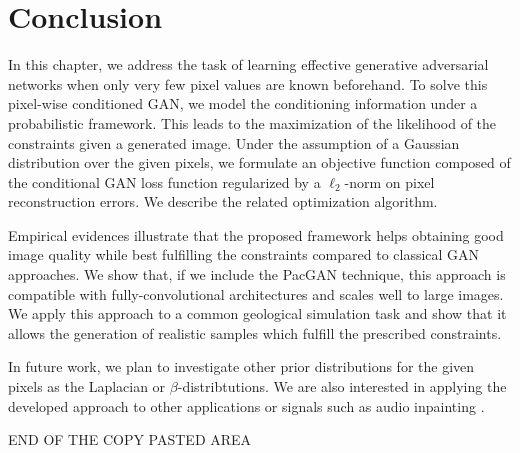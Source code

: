 \section*{Conclusion}
In this chapter, we address the task of learning effective generative adversarial networks when only very few pixel values are known beforehand. To solve this pixel-wise conditioned GAN, we model the conditioning information under a probabilistic framework. This leads to the maximization of the likelihood of the constraints given a
generated image. Under the assumption of a Gaussian distribution over the given pixels, we formulate an objective function composed of the conditional GAN loss function regularized by a $\ell_2$-norm on pixel reconstruction errors. We describe the related optimization algorithm.

Empirical evidences illustrate that the proposed framework helps obtaining good image quality while best fulfilling the constraints compared to classical GAN approaches. We show that, if we include the PacGAN technique,  this  approach  is  compatible  with  fully-convolutional  architectures  and scales well to large images. We apply this approach to a common geological simulation task and show that it allows the generation of realistic samples which fulfill the prescribed constraints.

In future work, we plan to investigate other prior distributions for the given pixels as the Laplacian or $\beta$-distribtutions. We are also interested in applying the developed approach to other applications or signals such as audio inpainting \citep{Marafioti2018}.



{\Huge END OF THE COPY PASTED AREA}


 
